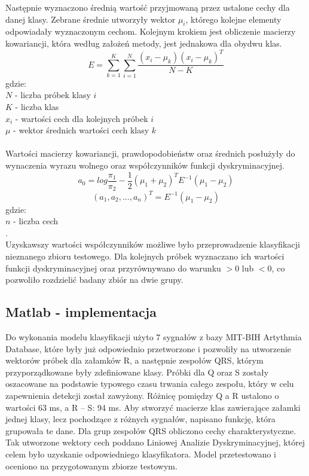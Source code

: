 \documentclass[[10pt,a4paper]{article}
\begin{document}
Następnie wyznaczono średnią wartość przyjmowaną przez ustalone cechy dla danej klasy. Zebrane średnie utworzyły wektor $\mu_i$, którego kolejne elementy odpowiadały wyznaczonym cechom. Kolejnym krokiem jest obliczenie macierzy kowariancji, która według założeń metody, jest jednakowa dla obydwu klas.
\begin{equation}
E=\sum^K_{k=1}\sum^N_{i=1} \frac{(x_i-\mu_k)(x_i-\mu_k)^T} {N-K}
\end{equation}
gdzie:\\
$N$ - liczba próbek klasy $i$ \\
$K$ - liczba klas\\
$x_i$ - wartości cech dla kolejnych próbek $i$\\
$\mu$ - wektor średnich wartości cech klasy $k$\\
\\
Wartości macierzy kowariancji, prawdopodobieństw oraz średnich posłużyły do wynaczenia wyrazu wolnego oraz współczynników funkcji dyskryminacyjnej.
\begin{equation}
a_0=log\frac{\pi_1}{\pi_2} - \frac{1}{2} (\mu_1+\mu_2)^T E^{-1}(\mu_1-\mu_2)
\end{equation}
\begin{equation}
(a_1,a_2,...,a_n)^T=E^{-1}(\mu_1-\mu_2)
\end{equation}
 gdzie:\\
$n$ - liczba cech \\.
\\
Uzyskawszy wartości współczynników możliwe było przeprowadzenie klasyfikacji nieznanego zbioru testowego. Dla kolejnych próbek wyznaczano ich wartości funkcji dyskryminacyjnej oraz przyrównywano do warunku $>0$ lub $<0$, co pozwoliło rozdzielić badany zbiór na dwie grupy.
 


\subsection{Matlab - implementacja}

Do wykonania modelu klasyfikacji użyto 7 sygnałów z bazy MIT-BIH Artythmia Database, które były już odpowiednio przetworzone i pozwoliły na utworzenie wektorów próbek dla załamków R, a następnie zespołów QRS, którym przyporządkowane były zdefiniowane klasy. Próbki dla Q oraz S zostały oszacowane na podstawie typowego czasu trwania całego zespołu, który w celu zapewnienia detekcji został zawyżony. Różnicę pomiędzy Q a R ustalono o wartości 63 ms, a R -- S: 94 ms. Aby stworzyć macierze klas zawierające załamki jednej klasy, lecz pochodzące z różnych sygnałów, napisano funkcję, która grupowała te dane. Dla grup zespołów QRS obliczono cechy charakterystyczne. Tak utworzone wektory cech poddano Liniowej Analizie Dyskryminacyjnej, której celem było uzyskanie odpowiedniego klasyfikatora. Model przetestowano i oceniono na przygotowanym zbiorze testowym.\\
\end{document}
